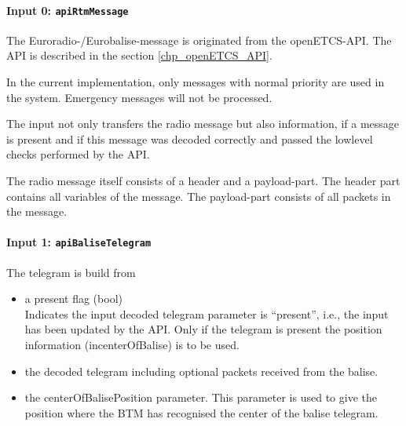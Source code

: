 \documentclass{template/openetcs_report}
\begin{document}
\paragraph{Input 0: \texttt{apiRtmMessage}}

The Euroradio-/Eurobalise-message is originated from the openETCS-API. The API is described in the section \ref{chp_openETCS_API}.

In the current implementation, only messages with normal priority are used in the system. Emergency messages will not be processed.


The input not only transfers the radio message but also information, if a message is present and if this message was decoded correctly and passed the lowlevel checks performed by the API.

The radio message itself consists of a header and a payload-part. The header part contains all variables of the message. The payload-part consists of all packets in the message.

\paragraph{Input 1: \texttt{apiBaliseTelegram}}

The telegram is build from 
\begin{itemize}
\item a present flag (bool)\\
Indicates the input decoded telegram parameter is “present”, i.e., the input has been updated by the API.
Only if the telegram is present the position information (incenterOfBalise) is to be used.\\
\item the decoded telegram including optional packets received from the balise.
\item the centerOfBalisePosition parameter. This parameter is used to give the position where the BTM has recognised the center of the balise telegram.
\end{itemize}
\end{document}
